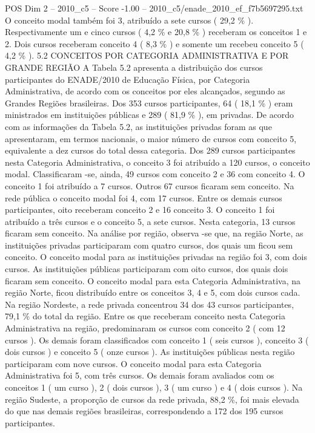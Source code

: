 \begin{textsample}{POS Dim 2 – 2010\_c5 – Score -1.00 – 2010\_c5/enade\_2010\_ef\_f7b5697295.txt}
O conceito modal também foi 3, atribuído a sete cursos ( 29,2 \% ).
Respectivamente um e cinco cursos ( 4,2 \% e 20,8 \% ) receberam os conceitos 1 e 2.
Dois cursos receberam conceito 4 ( 8,3 \% ) e somente um recebeu conceito 5 ( 4,2 \% ). 5.2 CONCEITOS POR CATEGORIA ADMINISTRATIVA E POR GRANDE REGIÃO A Tabela 5.2 apresenta a distribuição dos cursos participantes do ENADE/2010 de Educação Física, por Categoria Administrativa, de acordo com os conceitos por eles alcançados, segundo as Grandes Regiões brasileiras.
Dos 353 cursos participantes, 64 ( 18,1 \% ) eram ministrados em instituições públicas e 289 ( 81,9 \% ), em privadas.
De acordo com as informações da Tabela 5.2, as instituições privadas foram as que apresentaram, em termos nacionais, o maior número de cursos com conceito 5, equivalente a dez cursos do total dessa categoria.
Dos 289 cursos participantes nesta Categoria Administrativa, o conceito 3 foi atribuído a 120 cursos, o conceito modal.
Classificaram -se, ainda, 49 cursos com conceito 2 e 36 com conceito 4.
O conceito 1 foi atribuído a 7 cursos.
Outros 67 cursos ficaram sem conceito.
Na rede pública o conceito modal foi 4, com 17 cursos.
Entre os demais cursos participantes, oito receberam conceito 2 e 16 conceito 3.
O conceito 1 foi atribuído a três cursos e o conceito 5, a sete cursos.
Nesta categoria, 13 cursos ficaram sem conceito.
Na análise por região, observa -se que, na região Norte, as instituições privadas participaram com quatro cursos, dos quais um ficou sem conceito.
O conceito modal para as instituições privadas na região foi 3, com dois cursos.
As instituições públicas participaram com oito cursos, dos quais dois ficaram sem conceito.
O conceito modal para esta Categoria Administrativa, na região Norte, ficou distribuído entre os conceitos 3, 4 e 5, com dois cursos cada.
Na região Nordeste, a rede privada concentrou 34 dos 43 cursos participantes, 79,1 \% do total da região.
Entre os que receberam conceito nesta Categoria Administrativa na região, predominaram os cursos com conceito 2 ( com 12 cursos ).
Os demais foram classificados com conceito 1 ( seis cursos ), conceito 3 ( dois cursos ) e conceito 5 ( onze cursos ).
As instituições públicas nesta região participaram com nove cursos.
O conceito modal para esta Categoria Administrativa foi 5, com três cursos.
Os demais foram avaliados com os conceitos 1 ( um curso ), 2 ( dois cursos ), 3 ( um curso ) e 4 ( dois cursos ).
Na região Sudeste, a proporção de cursos da rede privada, 88,2 \%, foi mais elevada do que nas demais regiões brasileiras, correspondendo a 172 dos 195 cursos participantes.

\end{textsample}
